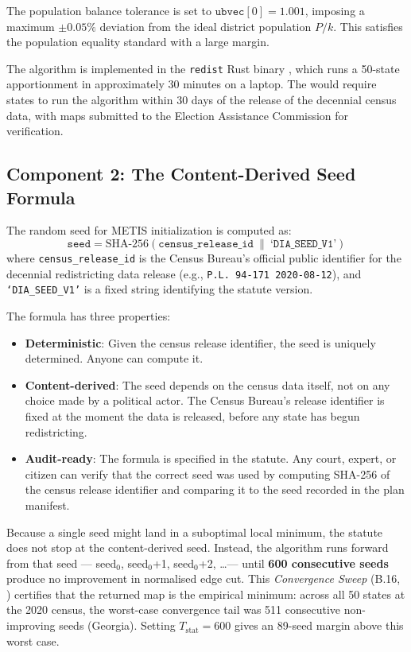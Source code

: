 The population balance tolerance is set to $\texttt{ubvec}[0] = 1.001$,
imposing a maximum $\pm 0.05\%$ deviation from the ideal district population
$P/k$.
This satisfies the \karcher{} population equality standard with a large margin.

The algorithm is implemented in the \texttt{redist} Rust binary
\citep{b0paper}, which runs a 50-state apportionment in approximately
30 minutes on a laptop.
The \dia{} would require states to run the algorithm within 30 days of
the release of the decennial census data, with maps submitted to the
Election Assistance Commission for verification.

\subsection{Component 2: The Content-Derived Seed Formula}

The random seed for METIS initialization is computed as:
\[
  \texttt{seed} = \text{SHA-256}(\texttt{census\_release\_id}\ \|\ \texttt{`DIA\_SEED\_V1'})
\]
where \texttt{census\_release\_id} is the Census Bureau's official public
identifier for the decennial redistricting data release (e.g.,
\texttt{P.L.\ 94-171\ 2020-08-12}), and \texttt{`DIA\_SEED\_V1'} is a
fixed string identifying the statute version.

The formula has three properties:
\begin{itemize}
  \item \textbf{Deterministic}: Given the census release identifier, the seed
    is uniquely determined.
    Anyone can compute it.
  \item \textbf{Content-derived}: The seed depends on the census data itself,
    not on any choice made by a political actor.
    The Census Bureau's release identifier is fixed at the moment the data
    is released, before any state has begun redistricting.
  \item \textbf{Audit-ready}: The formula is specified in the statute.
    Any court, expert, or citizen can verify that the correct seed was used
    by computing SHA-256 of the census release identifier and comparing it
    to the seed recorded in the plan manifest.
\end{itemize}

Because a single seed might land in a suboptimal local minimum, the statute
does not stop at the content-derived seed.
Instead, the algorithm runs forward from that seed — seed$_0$, seed$_0$+1,
seed$_0$+2, \ldots --- until \textbf{600 consecutive seeds} produce no
improvement in normalised edge cut.
This \emph{Convergence Sweep} (B.16, \citealt{b16paper}) certifies that the
returned map is the empirical minimum: across all 50 states at the 2020
census, the worst-case convergence tail was 511 consecutive non-improving seeds
(Georgia).
Setting $T_{\text{stat}} = 600$ gives an 89-seed margin above this worst case.

